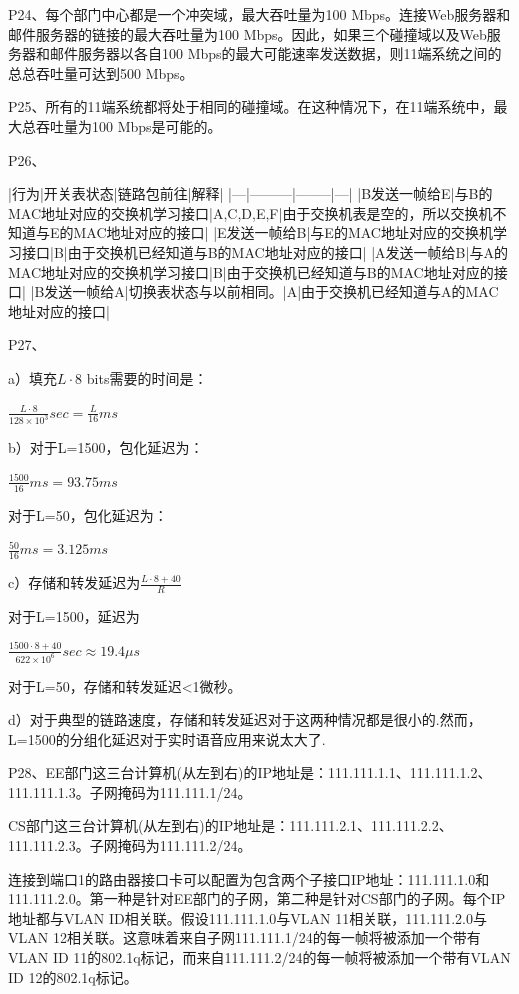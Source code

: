 \documentclass[11pt,UTF8,twoside]{article}
\begin{document}
{		P24、每个部门中心都是一个冲突域，最大吞吐量为100 Mbps。连接Web服务器和邮件服务器的链接的最大吞吐量为100 Mbps。因此，如果三个碰撞域以及Web服务器和邮件服务器以各自100 Mbps的最大可能速率发送数据，则11端系统之间的总总吞吐量可达到500 Mbps。
		
		P25、所有的11端系统都将处于相同的碰撞域。在这种情况下，在11端系统中，最大总吞吐量为100 Mbps是可能的。
		
		P26、
		
		|行为|开关表状态|链路包前往|解释|
		|---|---------|--------|---|
		|B发送一帧给E|与B的MAC地址对应的交换机学习接口|A,C,D,E,F|由于交换机表是空的，所以交换机不知道与E的MAC地址对应的接口|
		|E发送一帧给B|与E的MAC地址对应的交换机学习接口|B|由于交换机已经知道与B的MAC地址对应的接口|
		|A发送一帧给B|与A的MAC地址对应的交换机学习接口|B|由于交换机已经知道与B的MAC地址对应的接口|
		|B发送一帧给A|切换表状态与以前相同。|A|由于交换机已经知道与A的MAC地址对应的接口|
		
		P27、
		
		a）填充$L\cdot8$ bits需要的时间是：
		
		$\frac{L\cdot8}{128\times 10^3 } sec = \frac{L}{16}ms$
		
		b）对于L=1500，包化延迟为：
		
		$\frac{1500}{16}ms=93.75 ms$
		
		对于L=50，包化延迟为：
		
		$\frac{50}{16}ms=3.125 ms$
		
		c）存储和转发延迟为$\frac{L \cdot 8+40}{R}$
		
		对于L=1500，延迟为
		
		$\frac{1500\cdot 8+40}{622\times 10^{6}} sec \approx 19.4 \mu s$
		
		对于L=50，存储和转发延迟<1微秒。
		
		d）对于典型的链路速度，存储和转发延迟对于这两种情况都是很小的.然而，L=1500的分组化延迟对于实时语音应用来说太大了.
		
		P28、EE部门这三台计算机(从左到右)的IP地址是：111.111.1.1、111.111.1.2、111.111.1.3。子网掩码为111.111.1/24。
		
		CS部门这三台计算机(从左到右)的IP地址是：111.111.2.1、111.111.2.2、111.111.2.3。子网掩码为111.111.2/24。
		
		连接到端口1的路由器接口卡可以配置为包含两个子接口IP地址：111.111.1.0和111.111.2.0。第一种是针对EE部门的子网，第二种是针对CS部门的子网。每个IP地址都与VLAN ID相关联。假设111.111.1.0与VLAN 11相关联，111.111.2.0与VLAN 12相关联。这意味着来自子网111.111.1/24的每一帧将被添加一个带有VLAN ID 11的802.1q标记，而来自111.111.2/24的每一帧将被添加一个带有VLAN ID 12的802.1q标记。
		
}
\end{document}
